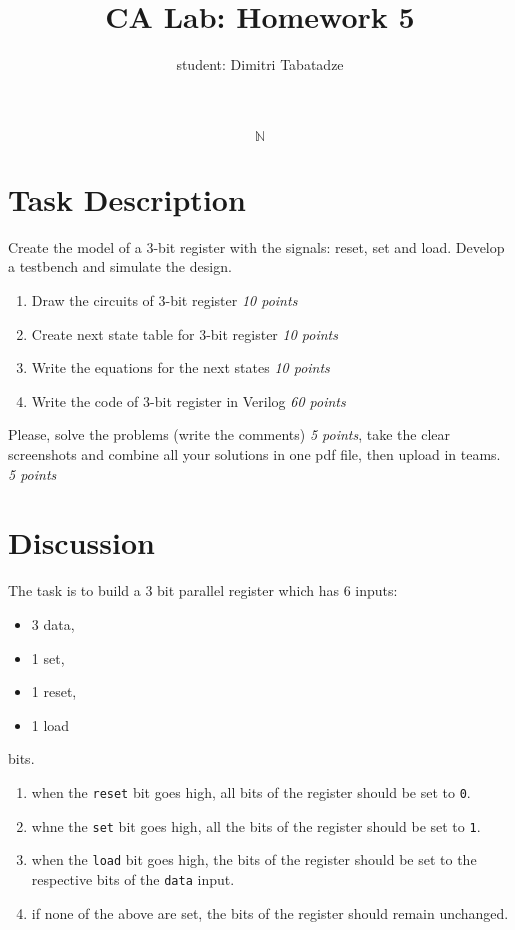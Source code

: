 \documentclass{article}
\title{CA Lab: Homework 5}
\author{student: Dimitri Tabatadze}
\newcommand{\points}[1]{{\footnotesize{\color{red}\textit{#1 points}}}}
\begin{document}
    \maketitle

    \begin{displaymath}
        \mathbb{N}
    \end{displaymath}

    \section*{Task Description} 
    
    Create the model of a 3-bit register with the signals: reset, set and load. Develop a testbench and simulate the design.

    \begin{enumerate}
        \item Draw the circuits of 3-bit register \points{10}
        \item Create next state table for 3-bit register \points{10}
        \item Write the equations for the next states \points{10}
        \item Write the code of 3-bit register in Verilog \points{60}
    \end{enumerate}

    Please, solve the problems (write the comments) \points{5}, take the clear screenshots and combine all your solutions in one pdf file, then upload in teams. \points{5}

    \section*{Discussion}

    The task is to build a 3 bit parallel register which has 6 inputs:
    \begin{itemize}\setlength\itemsep{0pt}
        \item 3 data,
        \item 1 set,
        \item 1 reset,
        \item 1 load
    \end{itemize}
    bits.
    \begin{enumerate}
        \item when the \verb|reset| bit goes high, all bits of the register should be set to \verb|0|.
        \item whne the \verb|set| bit goes high, all the bits of the register should be set to \verb|1|.
        \item when the \verb|load| bit goes high, the bits of the register should be set to the respective bits of the \verb|data| input.
        \item if none of the above are set, the bits of the register should remain unchanged.
    \end{enumerate}
\end{document}
